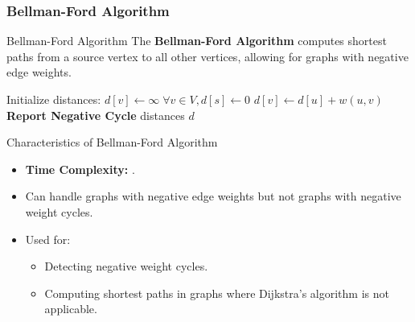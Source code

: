 



\newpage
\subsubsection{Bellman-Ford Algorithm}
\begin{definition}[]{Bellman-Ford Algorithm}
    The \textbf{Bellman-Ford Algorithm} computes shortest paths from a source vertex to all other vertices, allowing for graphs with negative edge weights.
\end{definition}

\begin{algorithm}
    \caption{Bellman-Ford Algorithm}
    \begin{algorithmic}[1]
         
            \State Initialize distances: $d[v] \gets \infty \; \forall v \in V, d[s] \gets 0$
             
                        \State $d[v] \gets d[u] + w(u, v)$
                    \EndIf
                \EndFor
            \EndFor
             
                    \State \textbf{Report Negative Cycle}
                \EndIf
            \EndFor
            \State \Return distances $d$
        \EndProcedure
    \end{algorithmic}
\end{algorithm}

\begin{properties}[]{Characteristics of Bellman-Ford Algorithm}
    \begin{itemize}
        \item \textbf{Time Complexity:} .
        \item Can handle graphs with negative edge weights but not graphs with negative weight cycles.
        \item Used for:
              \begin{itemize}
                  \item Detecting negative weight cycles.
                  \item Computing shortest paths in graphs where Dijkstra’s algorithm is not applicable.
              \end{itemize}
    \end{itemize}
\end{properties}

